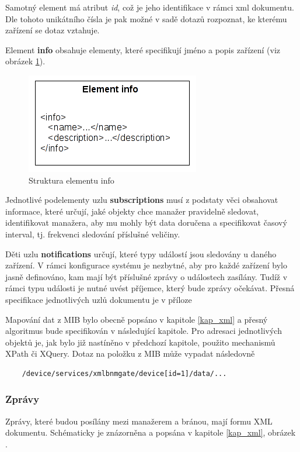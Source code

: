 Samotný element má atribut \textit{id}, což je jeho identifikace v rámci xml dokumentu. Dle tohoto unikátního čísla je pak možné
v sadě dotazů rozpoznat, ke kterému zařízení se dotaz vztahuje.


Element \textbf{info} obsahuje elementy, které specifikují jméno a popis zařízení (viz obrázek \ref{obr_an_info_element}).

\begin{figure}[htp]
	\begin{center}
		\includegraphics{obrazky/04_element_info.png}
		\caption{Struktura elementu info}
		\label{obr_an_info_element}
	\end{center}
\end{figure}

Jednotlivé podelementy uzlu \textbf{subscriptions} musí z podstaty věci obsahovat informace, které určují, jaké objekty chce manažer pravidelně sledovat, identifikovat
manažera, aby mu mohly být data doručena a specifikovat časový interval, tj. frekvenci sledování příslušné veličiny.

Děti uzlu \textbf{notifications} určují, které typy událostí jsou sledovány u daného zařízení. V rámci konfigurace systému je nezbytné, aby pro každé zařízení
bylo jasně definováno, kam mají být příslušné zprávy o událostech zasílány. Tudíž v rámci typu události je nutné uvést příjemce, který bude zprávy očekávat. Přesná 
specifikace jednotlivých uzlů dokumentu je v příloze 

Mapování dat z MIB bylo obecně popsáno v kapitole \ref{kap_xml} a přesný algoritmus bude specifikován v následující kapitole. Pro adresaci jednotlivých objektů
je, jak bylo již nastíněno v předchozí kapitole, použito mechanismů XPath či XQuery. Dotaz na položku z MIB může vypadat následovně
\begin{verbatim}
	/device/services/xmlbnmgate/device[id=1]/data/...
\end{verbatim}

\subsubsection*{Zprávy}
Zprávy, které budou posílány mezi manažerem a bránou, mají formu XML dokumentu. Schématicky je znázorněna a popsána v kapitole \ref{kap_xml}, obrázek .

